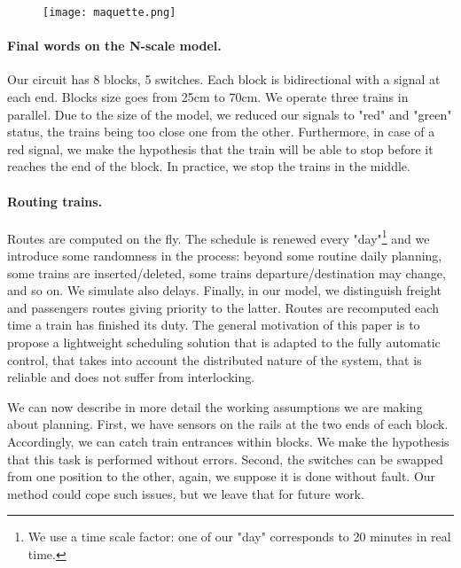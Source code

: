 \documentclass[runningheads]{llncs}
\begin{document}
\begin{figure}
 \begin{minipage}{0.28\textwidth}
        \centering
        \vspace{-8mm}
\texttt{[image: maquette.png]}
    \end{minipage}
\end{figure}

\paragraph{Final words on the N-scale model.} Our circuit has 8 blocks, 5 switches. Each block is bidirectional with a signal at each end. Blocks size goes from 25cm to 70cm.  We operate  three trains in parallel. Due to the size of the model, we reduced our signals  to "red" and "green" status, the trains being too close one from the other. Furthermore, in case of a red signal, we make the hypothesis that the train will be able to stop before it reaches the end of the block. In practice, we stop the trains in the middle. 

\paragraph{Routing trains.}
Routes are computed on the fly. The schedule is renewed every "day"\footnote{We use a time scale factor: one of our "day" corresponds to 20 minutes in real time.}  and we introduce some randomness in the process: beyond some routine daily planning, some trains are inserted/deleted, some trains departure/destination may change, and so on. We simulate also delays. Finally, in our model, we distinguish freight and  passengers routes giving priority to the latter. Routes are recomputed each time a train has finished its duty. The general motivation of this paper is to propose a lightweight scheduling solution that is adapted to the fully automatic control, that takes into account the distributed nature of the system, that is reliable and does not suffer from interlocking.  
 
We can now describe in more detail the working assumptions we are making about planning.  First, we have sensors on the rails at the two ends of each block. Accordingly,  we can catch train entrances within blocks. We make the hypothesis that this task is performed without errors. Second, the switches can be swapped from one position to the other, again, we suppose it is done without fault. Our method could cope such issues, but we leave that for future work. 
 
\end{document}
